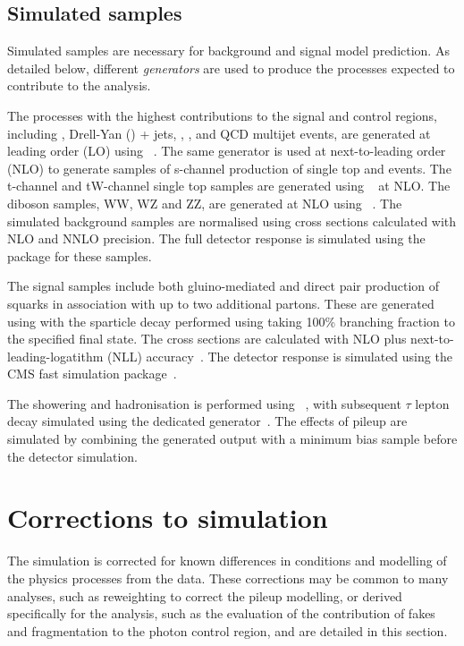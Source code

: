 \subsection{Simulated samples}
Simulated samples are necessary for background and signal model prediction. As detailed below, 
different \emph{generators} are used to produce the processes expected to contribute to
the \alphat analysis.

The processes with the highest contributions to the signal and control regions, 
including \zj, Drell-Yan (\dy) + jets, \gj, \ttbar, \wj and QCD multijet events, are generated at leading order (LO) 
using \MADGRAPH \AMCATNLO~\cite{Alwall:2014hca}. The same generator is used at next-to-leading order (NLO)
to generate samples of s-channel production of single top and \ttV events.
The t-channel and tW-channel single top samples are generated using \POWHEG~\cite{Alioli:2010xd} at NLO.
The diboson samples, WW, WZ and ZZ, are generated at NLO using \PYTHIA~\cite{PYTHIA}. 
The simulated background samples are normalised using cross sections calculated with NLO and NNLO precision.%
The full detector response is simulated using the \GEANTfour package for these samples.

The signal samples include both gluino-mediated and direct pair production of squarks in
association with up to two additional partons. These are generated using \MADGRAPH \AMCATNLO
with the sparticle decay performed using \PYTHIA  taking 100\% branching fraction 
to the specified final state. The cross sections are calculated with
NLO plus next-to-leading-logatithm (NLL) accuracy~\cite{sparticleXs}. The detector response
is simulated using the CMS fast simulation package~\cite{fastsim}.

The showering and hadronisation is performed using \PYTHIA~\cite{PYTHIA}, with subsequent 
$\tau$ lepton decay simulated using the dedicated \TAUOLA generator~\cite{TAUOLO}. The effects
of pileup are simulated by combining the generated output with a minimum bias sample 
before the detector simulation.

\section{Corrections to simulation}
\label{sec:corr-sim}
The simulation is corrected for known differences in conditions and modelling of
the physics processes from the data. These corrections may be common to many analyses,
such as reweighting to correct the pileup modelling, or derived specifically for the \alphat 
analysis, such as the evaluation of the contribution of fakes and fragmentation
to the photon control region, and are detailed in this section.
